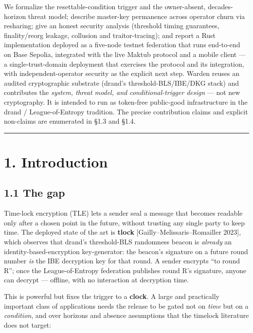 \documentclass[
  11pt,
]{article}
\begin{document}
We formalize the resettable-condition trigger and the owner-absent,
decades-horizon threat model; describe master-key permanence across
operator churn via resharing; give an honest security analysis
(threshold timing guarantees, finality/reorg leakage, collusion and
traitor-tracing); and report a Rust implementation deployed as a
five-node testnet federation that runs end-to-end on Base Sepolia,
integrated with the live Maktub protocol and a mobile client --- a
single-trust-domain deployment that exercises the protocol and its
integration, with independent-operator security as the explicit next
step. Warden reuses an audited cryptographic substrate (drand's
threshold-BLS/IBE/DKG stack) and contributes the \emph{system, threat
model, and conditional-trigger design} --- not new cryptography. It is
intended to run as token-free public-good infrastructure in the drand /
League-of-Entropy tradition. The precise contribution claims and
explicit non-claims are enumerated in §1.3 and §1.4.

\begin{center}\rule{0.5\linewidth}{0.5pt}\end{center}

\section{1. Introduction}\label{introduction}

\subsection{1.1 The gap}\label{the-gap}

Time-lock encryption (TLE) lets a sender seal a message that becomes
readable only after a chosen point in the future, without trusting any
single party to keep time. The deployed state of the art is
\textbf{tlock} {[}Gailly--Melissaris--Romailler 2023{]}, which observes
that drand's threshold-BLS randomness beacon is \emph{already} an
identity-based-encryption key-generator: the beacon's signature on a
future round number \emph{is} the IBE decryption key for that round. A
sender encrypts ``to round R''; once the League-of-Entropy federation
publishes round R's signature, anyone can decrypt --- offline, with no
interaction at decryption time.

This is powerful but fixes the trigger to a \textbf{clock}. A large and
practically important class of applications needs the release to be
gated not on \emph{time} but on a \emph{condition}, and over horizons
and absence assumptions that the timelock literature does not target:
\end{document}
